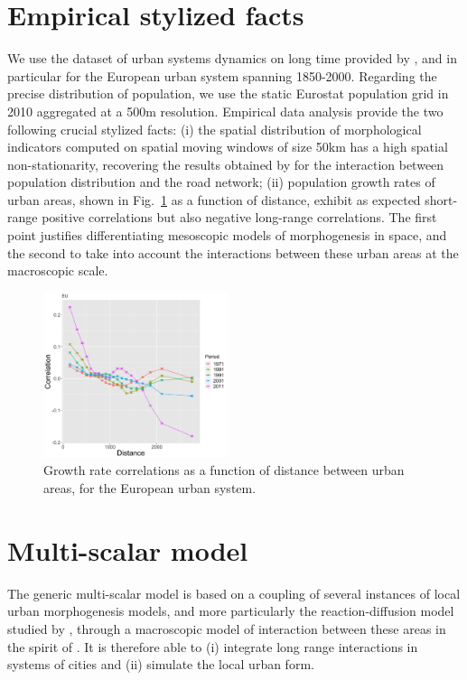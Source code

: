 \documentclass[a4paper,twocolumn,twoside,10pt]{article}
\theoremstyle{definition}
\begin{document}
\section{Empirical stylized facts}

We use the dataset of urban systems dynamics on long time provided by \cite{pumain2015multilevel}, and in particular for the European urban system spanning 1850-2000. Regarding the precise distribution of population, we use the static Eurostat population grid in 2010 aggregated at a 500m resolution. Empirical data analysis provide the two following crucial stylized facts: (i) the spatial distribution of morphological indicators computed on spatial moving windows of size 50km has a high spatial non-stationarity, recovering the results obtained by \cite{raimbault2018urban} for the interaction between population distribution and the road network; (ii) population growth rates of urban areas, shown in Fig.~\ref{fig:empcorrs} as a function of distance, exhibit as expected short-range positive correlations but also negative long-range correlations. The first point justifies differentiating mesoscopic models of morphogenesis in space, and the second to take into account the interactions between these urban areas at the macroscopic scale.


\begin{figure}[htp]
\centering
\includegraphics[width=0.48\textwidth]{figures/corrsdist_EU_quantiles21_periods5.png}
\caption{Growth rate correlations as a function of distance between urban areas, for the European urban system.}
\label{fig:empcorrs}
\end{figure}




\section{Multi-scalar model}


The generic multi-scalar model is based on a coupling of several instances of local urban morphogenesis models, and more particularly the reaction-diffusion model studied by \cite{raimbault2018calibration}, through a macroscopic model of interaction between these areas in the spirit of \cite{raimbault2018indirect}. It is therefore able to (i) integrate long range interactions in systems of cities and (ii) simulate the local urban form.
\end{document}
